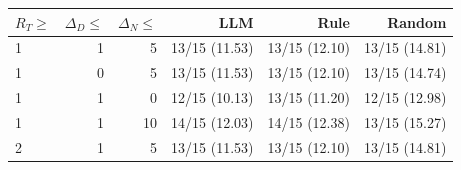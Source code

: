 \begin{tabular}{lrrrrr}
\toprule
$R_T\geq$ & $\Delta_D\leq$ & $\Delta_N\leq$ & LLM & Rule & Random \\
\midrule
1 & 1 & 5 & 13/15 (11.53) & 13/15 (12.10) & 13/15 (14.81) \\
1 & 0 & 5 & 13/15 (11.53) & 13/15 (12.10) & 13/15 (14.74) \\
1 & 1 & 0 & 12/15 (10.13) & 13/15 (11.20) & 12/15 (12.98) \\
1 & 1 & 10 & 14/15 (12.03) & 14/15 (12.38) & 13/15 (15.27) \\
2 & 1 & 5 & 13/15 (11.53) & 13/15 (12.10) & 13/15 (14.81) \\
\bottomrule
\end{tabular}
